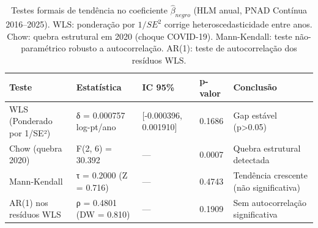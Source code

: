 \begin{table}
\caption{Testes formais de tendência no coeficiente $\hat{\beta}_{negro}$ (HLM anual, PNAD Contínua 2016--2025). WLS: ponderação por $1/SE^2$ corrige heteroscedasticidade entre anos. Chow: quebra estrutural em 2020 (choque COVID-19). Mann-Kendall: teste não-paramétrico robusto a autocorrelação. AR(1): teste de autocorrelação dos resíduos WLS.}
\label{tab:tendencia_temporal}
\begin{tabular}{lllll}
\toprule
Teste & Estatística & IC 95\% & p-valor & Conclusão \\
\midrule
WLS (Ponderado por 1/SE²) & δ = 0.000757 log-pt/ano & [-0.000396, 0.001910] & 0.1686 & Gap estável (p>0.05) \\
Chow (quebra 2020) & F(2, 6) = 30.392 & — & 0.0007 & Quebra estrutural detectada \\
Mann-Kendall & τ = 0.2000  (Z = 0.716) & — & 0.4743 & Tendência crescente (não significativa) \\
AR(1) nos resíduos WLS & ρ = 0.4801  (DW = 0.810) & — & 0.1909 & Sem autocorrelação significativa \\
\bottomrule
\end{tabular}
\end{table}
